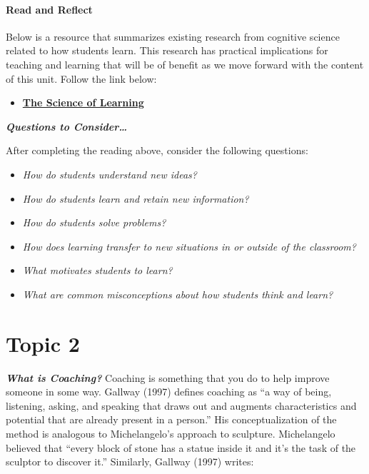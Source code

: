 \documentclass[
]{book}
\providecommand{\tightlist}{%
  \setlength{\itemsep}{0pt}\setlength{\parskip}{0pt}}
\begin{document}
\begin{reflect}
\hypertarget{read-and-reflect}{%
\paragraph{Read and Reflect}\label{read-and-reflect}}

Below is a resource that summarizes existing research from cognitive
science related to how students learn. This research has practical
implications for teaching and learning that will be of benefit as we
move forward with the content of this unit. Follow the link below:

\begin{itemize}
\tightlist
\item
  \href{https://deansforimpact.org/wp-content/uploads/2016/12/The_Science_of_Learning.pdf}{\textbf{The
  Science of Learning}}
\end{itemize}

\textbf{\emph{Questions to Consider\ldots{}}}

After completing the reading above, consider the following questions:

\begin{itemize}
\tightlist
\item
  \emph{How do students understand new ideas?}
\item
  \emph{How do students learn and retain new information?}
\item
  \emph{How do students solve problems?}
\item
  \emph{How does learning transfer to new situations in or outside of
  the classroom?}
\item
  \emph{What motivates students to learn?}
\item
  \emph{What are common misconceptions about how students think and
  learn?}
\end{itemize}
\end{reflect}

\hypertarget{topic-2-1}{%
\section*{Topic 2}\label{topic-2-1}}

\textbf{\emph{What is Coaching?}} Coaching is something that you do to help improve someone in some way. Gallway (1997) defines coaching as ``a way of being, listening, asking, and speaking that draws out and augments characteristics and potential that are already present in a person.'' His conceptualization of the method is analogous to Michelangelo's approach to sculpture. Michelangelo believed that ``every block of stone has a statue inside it and it's the task of the sculptor to discover it.'' Similarly, Gallway (1997) writes:
\end{document}
